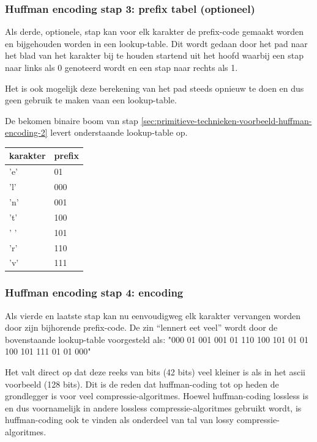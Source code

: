 \subsubsection{Huffman encoding stap 3: prefix tabel (optioneel)}
\label{sec:primitieve-technieken-voorbeeld-huffman-encoding-3}
Als derde, optionele, stap kan voor elk karakter de \gls{prefix-code} gemaakt worden en bijgehouden worden in een \gls{lookup-table}. Dit wordt gedaan door het pad naar het blad van het karakter bij te houden startend uit het hoofd waarbij een stap naar links als 0 genoteerd wordt en een stap naar rechts als 1.

Het is ook mogelijk deze berekening van het pad steeds opnieuw te doen en dus geen gebruik te maken vaan een \gls{lookup-table}.

De bekomen binaire boom van stap \ref{sec:primitieve-technieken-voorbeeld-huffman-encoding-2} levert onderstaande \gls{lookup-table} op.

\FloatBarrier
\begin{table}[h!]
	\begin{tabular}{|l|l|}
		\hline
		\textbf{karakter} & \textbf{prefix} \\ \hline
		'e'               & 01              \\ \hline
		'l'               & 000             \\ \hline
		'n'               & 001             \\ \hline
		't'               & 100             \\ \hline
		' '               & 101             \\ \hline
		'r'               & 110             \\ \hline
		'v'               & 111             \\ \hline  
	\end{tabular}
\end{table}
\FloatBarrier

\subsubsection{Huffman encoding stap 4: encoding}
\label{sec:primitieve-technieken-voorbeeld-huffman-encoding-4}
Als vierde en laatste stap kan nu eenvoudigweg elk karakter vervangen worden door zijn bijhorende \gls{prefix-code}. De zin “lennert eet veel” wordt door de bovenstaande \gls{lookup-table} voorgesteld als:
"000 01 001 001 01 110 100 101 01 01 100 101 111 01 01 000"

Het valt direct op dat deze reeks van \glspl{bit} (42 \glspl{bit}) veel kleiner is als in het \gls{ascii} voorbeeld (128 \glspl{bit}). Dit is de reden dat \gls{huffman-coding} tot op heden de grondlegger is voor veel \glspl{compressie-algoritme}. Hoewel \gls{huffman-coding} \gls{lossless} is en dus voornamelijk in andere \gls{lossless} \glspl{compressie-algoritme} gebruikt wordt, is \gls{huffman-coding} ook te vinden als onderdeel van tal van \gls{lossy} \glspl{compressie-algoritme}.


